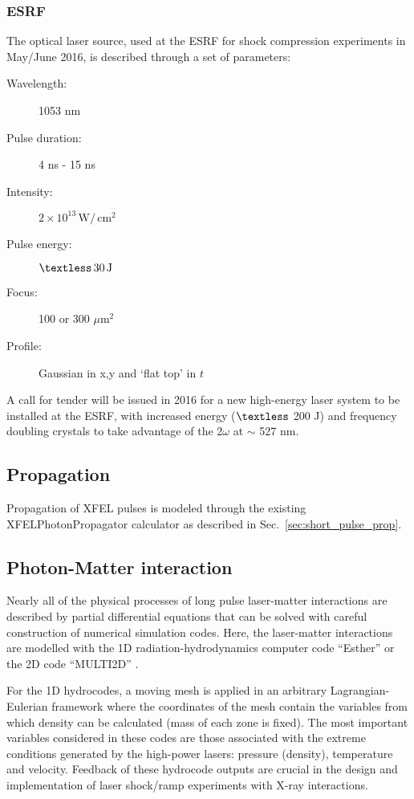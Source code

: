 \documentclass[a4paper]{article}
\begin{document}
\subsubsection{ESRF}
The optical laser source, used at the ESRF for shock compression experiments in May/June 2016,  is described through a set of parameters:
\begin{description}
  \item[Wavelength:] 1053 nm
  \item[Pulse duration:] 4 ns - 15 ns
  \item[Intensity:] $2\times 10^{13}\,\text{W}/\,\text{cm}^2$
  \item[Pulse energy:] $\textless \, 30\, \text{J}$
  \item[Focus:] 100 or 300 $\mu\text{m}^{2}$
  \item[Profile:] Gaussian in x,y and `flat top' in $t$
\end{description}
A call for tender will be issued in 2016 for a new high-energy laser system to be installed at the ESRF, with increased energy ($\textless$ 200 J) and frequency doubling crystals to take advantage of the 2$\omega$ at $\sim$ 527 nm.
\subsection{Propagation}
Propagation of XFEL pulses is modeled through the existing XFELPhotonPropagator calculator as described in Sec.~\ref{sec:short_pulse_prop}.
\subsection{Photon-Matter interaction}
Nearly all of the physical processes of long pulse laser-matter interactions are described by partial differential
equations that can be solved with careful construction of numerical simulation codes. Here, the laser-matter
interactions are modelled with the 1D radiation-hydrodynamics computer code ``Esther'' \cite{Colombier2005}
or the 2D code ``MULTI2D'' \cite{Ramis2009}.

For the 1D hydrocodes, a moving mesh is applied in an arbitrary Lagrangian-Eulerian framework where the coordinates of
the mesh contain the variables from which density can be calculated (mass of each zone is fixed). The most important variables
considered in these codes are those associated with the extreme conditions generated by the high-power lasers: pressure (density),
temperature and velocity. Feedback of these hydrocode outputs are crucial in the design and implementation of laser shock/ramp
experiments with X-ray interactions.
\end{document}
